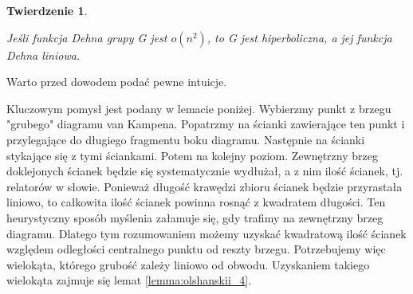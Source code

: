 \documentclass[licencjacka]{pracamgr}
\newtheorem{ther}{Twierdzenie}[section]
\begin{document}
\begin{ther}\label{thm:subquadratic_hyperbolic}

Jeśli funkcja Dehna grupy G jest $o(n^2)$, to G jest hiperboliczna, a jej funkcja Dehna liniowa.

\end{ther}

Warto przed dowodem podać pewne intuicje.

Kluczowym pomysł jest podany w lemacie poniżej. Wybierzmy punkt z brzegu "grubego" diagramu van Kampena. Popatrzmy na ścianki zawierające ten punkt i przylegające do długiego fragmentu boku diagramu. Następnie na ścianki stykające się z tymi ściankami. Potem na kolejny poziom. Zewnętrzny brzeg doklejonych ścianek będzie się systematycznie wydłużał, a z nim ilość ścianek, tj. relatorów w słowie. Ponieważ długość krawędzi zbioru ścianek będzie przyrastała liniowo, to całkowita ilość ścianek powinna rosnąć z kwadratem długości. Ten heurystyczny sposób myślenia załamuje się, gdy trafimy na zewnętrzny brzeg diagramu. Dlatego tym rozumowaniem możemy uzyskać kwadratową ilość ścianek względem odległości centralnego punktu od reszty brzegu. Potrzebujemy więc wielokąta, którego grubość zależy liniowo od obwodu. Uzyskaniem takiego wielokąta zajmuje się lemat \ref{lemma:olshanskii_4}.

\end{document}
